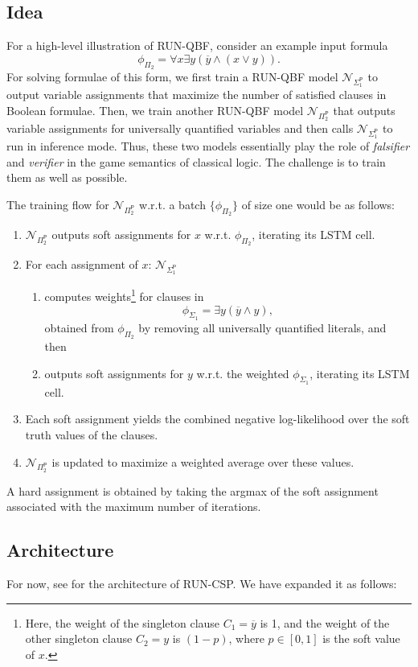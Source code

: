 \documentclass[12pt]{article}
\newcommand*{\PTIME}{\mathsf{P}}
\newcommand*{\RUNCSP}{\textrm{RUN-CSP}\xspace}
\newcommand*{\RUNQBF}{\textrm{RUN-QBF}\xspace}
\newcommand*{\calN}{\mathcal{N}}
\begin{document}
\subsection{Idea}
For a high-level illustration of \RUNQBF, consider an example input formula 
\[
\phi_{\Pi_2}=\forall x \exists y(\overline{y} \land (x \lor y)).
\]
For solving formulae of this form, we first train a \RUNQBF model $\calN_{\Sigma^\PTIME_1}$ to output variable assignments that maximize the number of satisfied clauses in Boolean formulae. Then, we train another \RUNQBF model $\calN_{\Pi^\PTIME_2}$ that outputs variable assignments for universally quantified variables and then calls  $\calN_{\Sigma^\PTIME_1}$ to run in inference mode. Thus, these two models essentially play the role of \emph{falsifier} and \emph{verifier} in the  game semantics of classical logic. The challenge is to train them as well as possible.

The training flow for $\calN_{\Pi^\PTIME_2}$ w.r.t. a batch $\{\phi_{\Pi_2}\}$ of size one would be as follows:
\begin{enumerate}
\item $\calN_{\Pi^\PTIME_2}$ outputs soft assignments for $x$ w.r.t. $\phi_{\Pi_2}$, iterating its LSTM cell.
\item For each assignment of $x$: $\calN_{\Sigma^\PTIME_1}$
\begin{enumerate}
\item  computes weights\footnote{Here, the weight of the singleton clause $C_1=\overline{y}$ is 1, and the weight of the other singleton clause $C_2=y$ is $(1-p)$, where $p\in [0,1]$ is the soft value of $x$.} for clauses in 
\[
\phi_{\Sigma_1} = \exists y ( \overline{y} \land y),
\]
obtained from $\phi_{\Pi_2}$ by removing all universally quantified literals, and then
\item outputs soft assignments for $y$ w.r.t. the weighted $\phi_{\Sigma_1}$, iterating its LSTM cell.
\end{enumerate}
\item Each soft assignment yields the combined negative log-likelihood over the soft truth values of the clauses.
\item $\calN_{\Pi^\PTIME_2}$ is updated to maximize a weighted average over these values.
\end{enumerate}

A hard assignment is obtained by taking the argmax of the soft assignment associated with the maximum number of iterations.


\subsection{Architecture}
For now, see \cite{TonshoffRWG20} for the architecture of \RUNCSP. We have expanded it as follows: 
\end{document}
